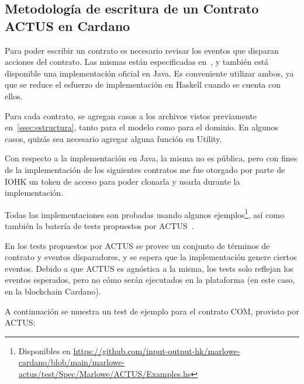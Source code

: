\documentclass[12pt]{book}
\begin{document}
\subsection{Metodología de escritura de un Contrato ACTUS en Cardano}

Para poder escribir un contrato es necesario revisar los eventos que disparan acciones del contrato. Las mismas están especificadas en~\cite{ACTUS_Techspecs}, y también está disponible una implementación oficial en Java. Es conveniente utilizar ambos, ya que se reduce el esfuerzo de implementación en Haskell cuando se cuenta con ellos.

Para cada contrato, se agregan casos a los archivos vistos previamente en~\ref{ssec:estructura}, tanto para el modelo como para el dominio. En algunos casos, quizás sea necesario agregar alguna función en Utility.

Con respecto a la implementación en Java, la misma no es pública, pero con fines de la implementación de los siguientes contratos me fue otorgado por parte de IOHK un token de acceso para poder clonarla y usarla durante la implementación.

Todas las implementaciones son probadas usando algunos ejemplos\footnote{Disponibles en \url{https://github.com/input-output-hk/marlowe-cardano/blob/main/marlowe-actus/test/Spec/Marlowe/ACTUS/Examples.hs}}, así como también la batería de tests propuestos por ACTUS~\cite{ACTUS_Tests}.

En los tests propuestos por ACTUS se provee un conjunto de términos de contrato y eventos disparadores, y se espera que la implementación genere ciertos eventos. Debido a que ACTUS es agnóstica a la misma, los tests solo reflejan los eventos esperados, pero no cómo serán ejecutados en la plataforma (en este caso, en la blockchain Cardano).

A continuación se muestra un test de ejemplo para el contrato COM, provisto por ACTUS:\@
\end{document}
